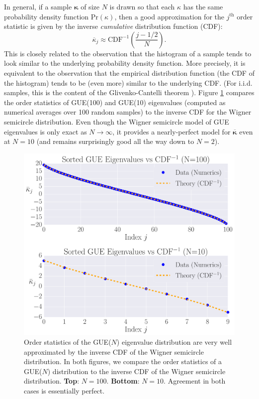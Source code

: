 \documentclass[aps,pra, twocolumn]{revtex4-1}
\newcommand{\bvec}[1]{\boldsymbol{#1}}
\begin{document}
In general, if a sample $\bvec{\kappa}$ of size $N$ is drawn so that each $\kappa$ has the same probability density 
function $\mathrm{Pr}(\kappa)$, then a good approximation for the $j^{\mathrm{th}}$ order statistic is given by the inverse 
\emph{cumulative} distribution function (CDF):
\begin{equation}
\overline{\kappa}_j \approx \mathrm{CDF}^{-1}\left(\frac{j-1/2}{N}\right).
\end{equation}
This is closely related to the observation that the histogram of a sample tends to look similar to the underlying probability density function.  More precisely, it is equivalent to the observation that the empirical distribution function (the CDF of the histogram) tends to be (even more) similar to the underlying CDF.  (For i.i.d. samples, this is the content of the Glivenko-Cantelli theorem \cite{VanderVaart2000}).  Figure \ref{fig:orderstatistics2} compares the order statistics of GUE(100) and GUE(10) eigenvalues (computed as numerical averages over 100 random samples) to the inverse CDF for the Wigner semicircle distribution.  Even though the Wigner semicircle model of GUE eigenvalues is only exact as $N\to\infty$, it provides a nearly-perfect model for $\overline{\bvec{\kappa}}$ even at $N=10$ (and remains surprisingly good all the way down to $N=2$).

\begin{figure}[h!]
\includegraphics[width=\columnwidth]{Images/Figure_4.pdf}
\caption{Order statistics of the GUE($N$) eigenvalue distribution are very well approximated by the inverse CDF of the Wigner semicircle distribution.  In both figures, we compare the order statistics of a GUE($N$) distribution to the inverse CDF of the Wigner semicircle distribution. \textbf{Top}:  $N=100$.  \textbf{Bottom}:  $N=10$.
Agreement in both cases is essentially perfect.}
\label{fig:orderstatistics2}
\end{figure}
\end{document}
